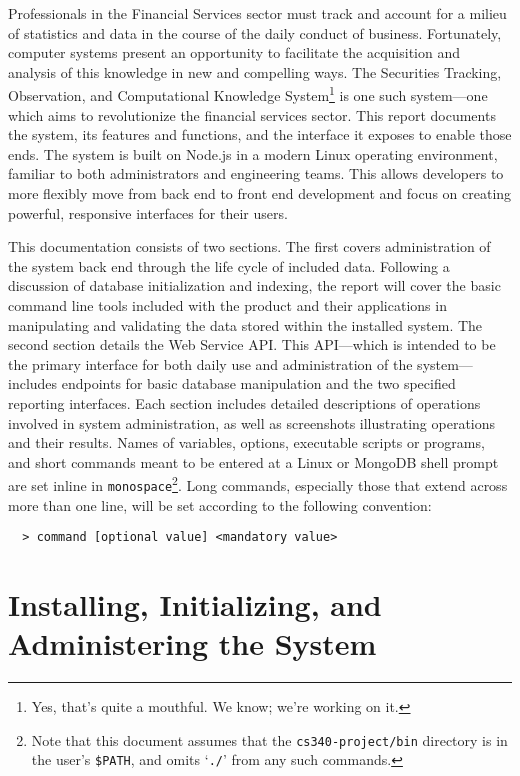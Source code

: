 \documentclass[
11pt,
titlepage,
]{article}
\begin{document}


Professionals in the Financial Services sector must track and account for a
milieu of statistics and data in the course of the daily conduct of business.
Fortunately, computer systems present an opportunity to facilitate the
acquisition and analysis of this knowledge in new and compelling ways. The
Securities Tracking, Observation, and Computational Knowledge
System\footnote{Yes, that's quite a mouthful. We know; we're working on it.} is
one such system---one which aims to revolutionize the financial services sector.
This report documents the system, its features and functions, and the interface
it exposes to enable those ends. The system is built on Node.js in a modern
Linux operating environment, familiar to both administrators and engineering
teams. This allows developers to more flexibly move from back end to front end
development and focus on creating powerful, responsive interfaces for their
users.

This documentation consists of two sections. The first covers administration of
the system back end through the life cycle of included data. Following a
discussion of database initialization and indexing, the report will cover the
basic command line tools included with the product and their applications in
manipulating and validating the data stored within the installed system. The
second section details the Web Service API. This API---which is intended to be
the primary interface for both daily use and administration of the
system---includes endpoints for basic database manipulation and the two
specified reporting interfaces. Each section includes detailed descriptions of
operations involved in system administration, as well as screenshots
illustrating operations and their results. Names of variables, options,
executable scripts or programs, and short commands meant to be entered at a
Linux or MongoDB shell prompt are set inline in
\texttt{monospace}\footnote{Note that this document assumes that the
\texttt{cs340-project/bin} directory is in the user's \texttt{\$PATH}, and omits
`\texttt{./}' from any such commands.}. Long
commands, especially those that extend across more than one line, will be set
according to the following convention:

\begin{lstlisting}
  > command [optional value] <mandatory value>
\end{lstlisting}

\section{Installing, Initializing, and Administering the System}
\end{document}
